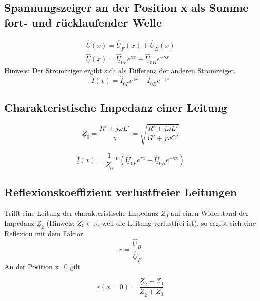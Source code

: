 \documentclass[11pt]{scrartcl}
\def\Uc{\underline{\hat U}}
\def\Ic{\underline{\hat I}}
\begin{document}
\subsection{Spannungszeiger an der Position x als Summe fort- und rücklaufender Welle}
\begin{eqnarray*}
	\Uc(x)=\Uc_F(x)+\Uc_B(x) \\
	\Uc(x)=\Uc_{0F} e^{\gamma x} + \Uc_{0B} e^{-\gamma x}
\end{eqnarray*}
Hinweis: Der Stromzeiger ergibt sich als Differenz der anderen Stromzeiger.
\begin{equation*}
	\Ic(x)=\Ic_{0F} e^{\gamma x} - \Ic_{0B} e^{-\gamma x}
\end{equation*}
\subsection{Charakteristische Impedanz einer Leitung}
\begin{mdframed}[backgroundcolor = sand]
	\begin{equation}
		\underline{Z}_0 = \frac{R'+j\omega L'}{\gamma} = \sqrt{\frac{R'+j\omega L'}{G' + j \omega C'}}
	\end{equation}
\end{mdframed}
\begin{equation}
\Ic(x) = \frac{1}{\underline{Z}_0} * (\Uc_{0F}  e^{\gamma x} - \Uc_{0B}  e^{-\gamma x})
\end{equation}
	

\subsection{Reflexionskoeffizient verlustfreier Leitungen}
Trifft eine Leitung der charakteristische Impedanz $Z_0$ auf einen Widerstand der Impedanz $\underline{Z}_2$ (Hinweis: $Z_0 \in \mathbb{R}$, weil die Leitung verlustfrei ist), so ergibt sich eine Reflexion mit dem Faktor
\begin{equation*}
	\underline{r} = \frac{\Uc_B}{\Uc_F}
\end{equation*}
An der Position x=0 gilt
\begin{mdframed}[backgroundcolor = sand]
	\begin{equation*}
		\underline{r}(x=0) = \frac{\underline{Z}_2-Z_0}{\underline{Z}_2+Z_0} 
	\end{equation*}
\end{mdframed}
\end{document}
